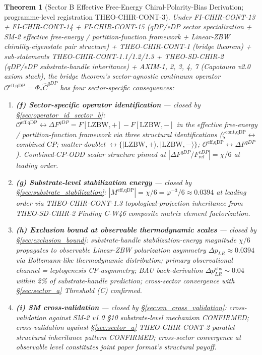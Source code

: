 \documentclass[11pt,letterpaper]{article}
\newtheorem{theorem}{Theorem}[section]
\newcommand{\DeltapLR}{\Delta p_{LR}}
\newcommand{\Phicont}{\Phi_*}
\newcommand{\OeffqDP}{\mathcal{O}^{\text{eff,qDP}}}
\newcommand{\DeltaFqDP}{\Delta F^{qDP}}
\newcommand{\FeDPref}{F^{eDP}_{\text{ref}}}
\begin{document}
\begin{theorem}[Sector B Effective Free-Energy Chiral-Polarity-Bias Derivation; programme-level registration THEO-CHIR-CONT-3]
\label{thm:sector_b}
Under FI-CHIR-CONT-13 + FI-CHIR-CONT-14 + FI-CHIR-CONT-15 (qDP/eDP sector specialization + SM-2 effective free-energy / partition-function framework + Linear-ZBW chirality-eigenstate pair structure) + THEO-CHIR-CONT-1 (bridge theorem) + sub-statements THEO-CHIR-CONT-1.1/1.2/1.3 + THEO-SD-CHIR-2 (qDP/eDP substrate-handle inheritance) + AXIM-1, 2, 3, 4, 7 (Capotauro v2.0 axiom stack), the bridge theorem's sector-agnostic continuum operator $\OeffqDP = \Phicont\hat{C}^{qDP}$ has four sector-specific consequences:
\begin{enumerate}[leftmargin=*]
\item \textbf{(f) Sector-specific operator identification} --- closed by §\ref{sec:operator_id_sector_b}: $\OeffqDP \leftrightarrow \DeltaFqDP = F[\text{LZBW},+] - F[\text{LZBW},-]$ in the effective free-energy / partition-function framework via three structural identifications ($\zeta^{\text{cont,qDP}} \leftrightarrow$ combined $CP$; matter-doublet $\leftrightarrow \{|\text{LZBW},+\rangle, |\text{LZBW},-\rangle\}$; $\OeffqDP \leftrightarrow \DeltaFqDP$). Combined-$CP$-ODD scalar structure pinned at $|\DeltaFqDP/\FeDPref| = \chi/6$ at leading order.
\item \textbf{(g) Substrate-level stabilization energy} --- closed by §\ref{sec:substrate_stabilization}: $|M^{\text{eff,qDP}}| = \chi/6 = \varphi^{-3}/6 \approx 0.0394$ at leading order via THEO-CHIR-CONT-1.3 topological-projection inheritance from THEO-SD-CHIR-2 Finding C-W46 composite matrix element factorization.
\item \textbf{(h) Exclusion bound at observable thermodynamic scales} --- closed by §\ref{sec:exclusion_bound}: substrate-handle stabilization-energy magnitude $\chi/6$ propagates to observable Linear-ZBW polarization asymmetry $\DeltapLR \approx 0.0394$ via Boltzmann-like thermodynamic distribution; primary observational channel = leptogenesis CP-asymmetry; BAU back-derivation $\DeltapLR^{\text{obs}} \sim 0.04$ within 2\% of substrate-handle prediction; cross-sector convergence with §\ref{sec:sector_a} Threshold (C) confirmed.
\item \textbf{(i) SM cross-validation} --- closed by §\ref{sec:sm_cross_validation}: cross-validation against SM-2 v1.0 §10 substrate-level mechanism CONFIRMED; cross-validation against §\ref{sec:sector_a} THEO-CHIR-CONT-2 parallel structural inheritance pattern CONFIRMED; cross-sector convergence at observable level constitutes joint paper format's structural payoff.
\end{enumerate}
\end{theorem}
\end{document}

